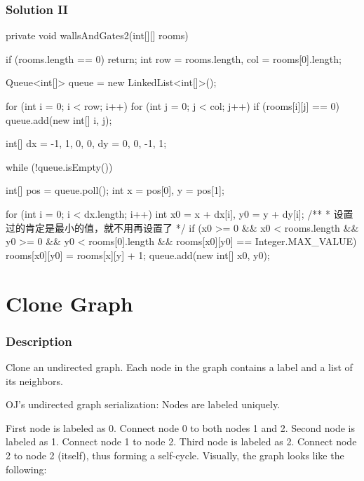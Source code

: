 \newpage

\subsubsection{Solution II}

\begin{Code}
private void wallsAndGates2(int[][] rooms) {
    if (rooms.length == 0) {
        return;
    }
    int row = rooms.length, col = rooms[0].length;

    Queue<int[]> queue = new LinkedList<int[]>();

    for (int i = 0; i < row; i++) {
        for (int j = 0; j < col; j++) {
            if (rooms[i][j] == 0) {
                queue.add(new int[] {i, j});
            }
        }
    }

    int[] dx = {-1, 1, 0, 0}, dy = {0, 0, -1, 1};

    while (!queue.isEmpty()) {
        int[] pos = queue.poll();
        int x = pos[0], y = pos[1];

        for (int i = 0; i < dx.length; i++) {
            int x0 = x + dx[i], y0 = y + dy[i];
            /**
             * 设置过的肯定是最小的值，就不用再设置了
             */
            if (x0 >= 0 && x0 < rooms.length && y0 >= 0 && y0 < rooms[0].length && rooms[x0][y0] == Integer.MAX_VALUE) {
                rooms[x0][y0] = rooms[x][y] + 1;
                queue.add(new int[] {x0, y0});
            }
        }
    }
}
\end{Code}

\newpage

\section{Clone Graph} %

\subsubsection{Description}

Clone an undirected graph. Each node in the graph contains a label and a list of its neighbors.

OJ's undirected graph serialization:
Nodes are labeled uniquely.

First node is labeled as 0. Connect node 0 to both nodes 1 and 2.
Second node is labeled as 1. Connect node 1 to node 2.
Third node is labeled as 2. Connect node 2 to node 2 (itself), thus forming a self-cycle.
Visually, the graph looks like the following:

